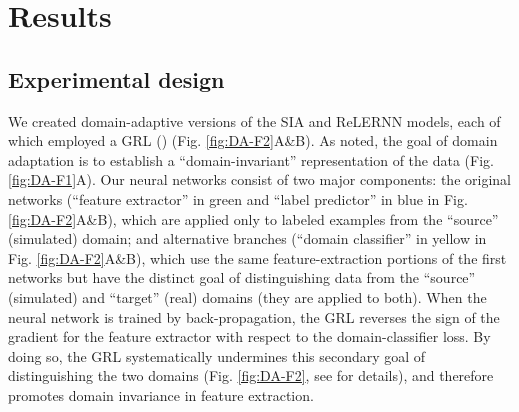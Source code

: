 \section{Results}

\subsection{Experimental design}
We created domain-adaptive versions of the \ac{SIA} and ReLERNN models, each of which employed a \acf{GRL} (\cite{ganin_unsupervised_2014}) (Fig. \ref{fig:DA-F2}A\&B). As noted, the goal of domain adaptation is to establish a “domain-invariant” representation of the data (Fig. \ref{fig:DA-F1}A). Our neural networks consist of two major components: the original networks (“feature extractor” in green and “label predictor” in blue in Fig. \ref{fig:DA-F2}A\&B), which are applied only to labeled examples from the “source” (simulated) domain; and alternative branches (“domain classifier” in yellow in Fig. \ref{fig:DA-F2}A\&B), which use the same feature-extraction portions of the first networks but have the distinct goal of distinguishing data from the “source” (simulated) and “target” (real) domains (they are applied to both). When the neural network is trained by back-propagation, the \ac{GRL} reverses the sign of the gradient for the feature extractor with respect to the domain-classifier loss. By doing so, the \ac{GRL} systematically undermines this secondary goal of distinguishing the two domains (Fig. \ref{fig:DA-F2}, see  for details), and therefore promotes domain invariance in feature extraction.


